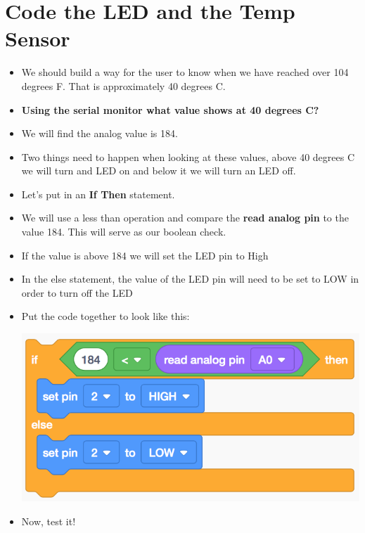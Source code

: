 \documentclass[12pt]{article}
\begin{document}
	
	
	
	
	
\section *{Code the LED and the Temp Sensor}
	\begin{itemize}
		\item We should build a way for the user to know when we have reached over 104 degrees F.  That is approximately 40 degrees C. 
		\item \textbf{Using the serial monitor what value shows at 40 degrees C?}
		\item We will find the analog value is 184.  
		\item Two things need to happen when looking at these values, above 40 degrees C we will turn and LED on and below it we will turn an LED off.
		\item Let's put in an \textbf{If Then} statement.
		\item We will use a less than operation and compare the \textbf{read analog pin} to the value 184.  This will serve as our boolean check.
		\item If the value is above 184 we will set the LED pin to High
		\newpage
		\item In the else statement, the value of the LED pin will need to be set to LOW in order to turn off the LED
		\item Put the code together to look like this:
		\begin{center}
			\includegraphics[scale = 0.7]{./Images/code2}
		\end{center}
		\item Now, test it!
	\end{itemize}
	
\end{document}
